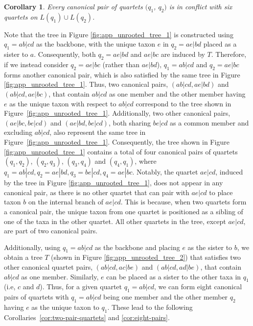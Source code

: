 \documentclass[10pt,a4paper]{article}
\newtheorem{corollary}{Corollary}[theorem]
\begin{document}
\begin{appendices}
\begin{corollary}
\label{cor:six_conflict}
Every canonical pair of quartets $(q_1$, $q_2)$ is in conflict with six quartets on $L(q_1) \cup L(q_2)$.
\end{corollary}



Note that the tree in Figure \ref{fig:app_unrooted_tree_1} is constructed using $q_1 = ab|cd$ as the backbone, with the unique taxon $e$ in $q_2 = ae|bd$ placed as a sister to $a$. Consequently, both $q_2 = ae|bd$ and $ae|bc$ are induced by $T$. Therefore, if we instead consider $q_2 = ae|bc$ (rather than $ae|bd$), $q_1 = ab|cd$ and $q_2 = ae|bc$ forms another canonical pair, which is also satisfied by the same tree in Figure \ref{fig:app_unrooted_tree_1}.
Thus, two canonical pairs, $(ab|cd, ae|bd)$ and $(ab|cd, ae|bc)$, that contain $ab|cd$ as one member and the other member having $e$ as the unique taxon with respect to $ab|cd$ correspond to the tree shown in Figure~\ref{fig:app_unrooted_tree_1}. Additionally, two other canonical pairs, $(ae|bc, be|cd)$ and $(ae|bd, be|cd)$, both sharing $be|cd$ as a common member and excluding $ab|cd$, also represent the same tree in Figure~\ref{fig:app_unrooted_tree_1}. Consequently, the tree shown in Figure \ref{fig:app_unrooted_tree_1} contains a total of four canonical pairs of quartets $(q_1,q_2)$, $(q_2,q_3)$, $(q_3,q_4)$ and $(q_4,q_1)$, where $q_1 = ab|cd, q_2 = ae|bd, q_3= be|cd, q_4 = ae|bc$. Notably, the quartet $ae|cd$, induced by the tree in Figure \ref{fig:app_unrooted_tree_1}, does not appear in any canonical pair, as there is no other quartet that can pair with $ae|cd$ to place taxon $b$ on the internal branch of $ae|cd$. This is because, when two quartets form a canonical pair, the unique taxon from one quartet is positioned as a sibling of one of the taxa in the other quartet. All other quartets in the tree, except $ae|cd$, are part of two canonical pairs.


Additionally, using $q_1 =ab|cd$ as the backbone and placing $e$ as the sister to $b$, we obtain a tree $T$ (shown in Figure \ref{fig:app_unrooted_tree_2}) that satisfies two other canonical quartet pairs, $(ab|cd, ac|be)$ and $(ab|cd, ad|be)$, that contain $ab|cd$ as one member. Similarly, $e$ can be placed as a sister to the other taxa in $q_1$ (i.e, $c$ and $d$). Thus, for a given quartet $q_1 = ab|cd$, we can form eight canonical pairs of quartets with $q_1 = ab|cd$ being one member and the other member $q_2$ having $e$ as the unique taxon to $q_1$. These lead to the following Corollaries~\ref{cor:two-pair-quartets} and \ref{cor:eight-pairs}. %



\end{appendices}
\end{document}
